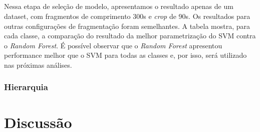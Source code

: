             \paragraph{} Nessa etapa de seleção de modelo, apresentamos o resultado apenas de um dataset, com fragmentos de comprimento 300s e \textit{crop} de 90s. Os resultados para outras configurações de fragmentação foram semelhantes. A tabela mostra, para cada classe, a comparação do resultado da melhor parametrização do SVM contra o \textit{Random Forest}. É possível observar que o \textit{ Random Forest} apresentou performance melhor que o SVM para todas as classes e, por isso, será utilizado nas próximas análises. 

        \subsection{Hierarquia}
        
        
\chapter{Discussão}
\label{Dicussion}